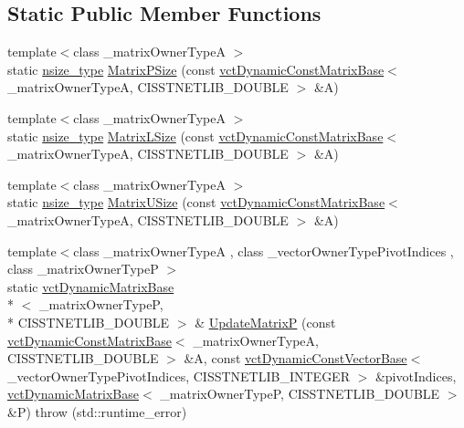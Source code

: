 \subsection*{Static Public Member Functions}
\begin{DoxyCompactItemize}
\item 
{\footnotesize template$<$class \-\_\-matrix\-Owner\-Type\-A $>$ }\\static \hyperlink{classnmr_l_u_dynamic_data_a5b722c87d1d635328893aa3f54ac35a1}{nsize\-\_\-type} \hyperlink{classnmr_l_u_dynamic_data_aa375c57067bf23d67ceca0f21af5a97e}{Matrix\-P\-Size} (const \hyperlink{classvct_dynamic_const_matrix_base}{vct\-Dynamic\-Const\-Matrix\-Base}$<$ \-\_\-matrix\-Owner\-Type\-A, C\-I\-S\-S\-T\-N\-E\-T\-L\-I\-B\-\_\-\-D\-O\-U\-B\-L\-E $>$ \&A)
\item 
{\footnotesize template$<$class \-\_\-matrix\-Owner\-Type\-A $>$ }\\static \hyperlink{classnmr_l_u_dynamic_data_a5b722c87d1d635328893aa3f54ac35a1}{nsize\-\_\-type} \hyperlink{classnmr_l_u_dynamic_data_acd1b9a9e749ea0a16d915d58d3a66b9e}{Matrix\-L\-Size} (const \hyperlink{classvct_dynamic_const_matrix_base}{vct\-Dynamic\-Const\-Matrix\-Base}$<$ \-\_\-matrix\-Owner\-Type\-A, C\-I\-S\-S\-T\-N\-E\-T\-L\-I\-B\-\_\-\-D\-O\-U\-B\-L\-E $>$ \&A)
\item 
{\footnotesize template$<$class \-\_\-matrix\-Owner\-Type\-A $>$ }\\static \hyperlink{classnmr_l_u_dynamic_data_a5b722c87d1d635328893aa3f54ac35a1}{nsize\-\_\-type} \hyperlink{classnmr_l_u_dynamic_data_a984c89b52c9455907020f029577a55f5}{Matrix\-U\-Size} (const \hyperlink{classvct_dynamic_const_matrix_base}{vct\-Dynamic\-Const\-Matrix\-Base}$<$ \-\_\-matrix\-Owner\-Type\-A, C\-I\-S\-S\-T\-N\-E\-T\-L\-I\-B\-\_\-\-D\-O\-U\-B\-L\-E $>$ \&A)
\item 
{\footnotesize template$<$class \-\_\-matrix\-Owner\-Type\-A , class \-\_\-vector\-Owner\-Type\-Pivot\-Indices , class \-\_\-matrix\-Owner\-Type\-P $>$ }\\static \hyperlink{classvct_dynamic_matrix_base}{vct\-Dynamic\-Matrix\-Base}\\*
$<$ \-\_\-matrix\-Owner\-Type\-P, \\*
C\-I\-S\-S\-T\-N\-E\-T\-L\-I\-B\-\_\-\-D\-O\-U\-B\-L\-E $>$ \& \hyperlink{classnmr_l_u_dynamic_data_ae8264b9afe51a6dc9062a28e76e76dd8}{Update\-Matrix\-P} (const \hyperlink{classvct_dynamic_const_matrix_base}{vct\-Dynamic\-Const\-Matrix\-Base}$<$ \-\_\-matrix\-Owner\-Type\-A, C\-I\-S\-S\-T\-N\-E\-T\-L\-I\-B\-\_\-\-D\-O\-U\-B\-L\-E $>$ \&A, const \hyperlink{classvct_dynamic_const_vector_base}{vct\-Dynamic\-Const\-Vector\-Base}$<$ \-\_\-vector\-Owner\-Type\-Pivot\-Indices, C\-I\-S\-S\-T\-N\-E\-T\-L\-I\-B\-\_\-\-I\-N\-T\-E\-G\-E\-R $>$ \&pivot\-Indices, \hyperlink{classvct_dynamic_matrix_base}{vct\-Dynamic\-Matrix\-Base}$<$ \-\_\-matrix\-Owner\-Type\-P, C\-I\-S\-S\-T\-N\-E\-T\-L\-I\-B\-\_\-\-D\-O\-U\-B\-L\-E $>$ \&P)  throw (std\-::runtime\-\_\-error)

\end{DoxyCompactItemize}

